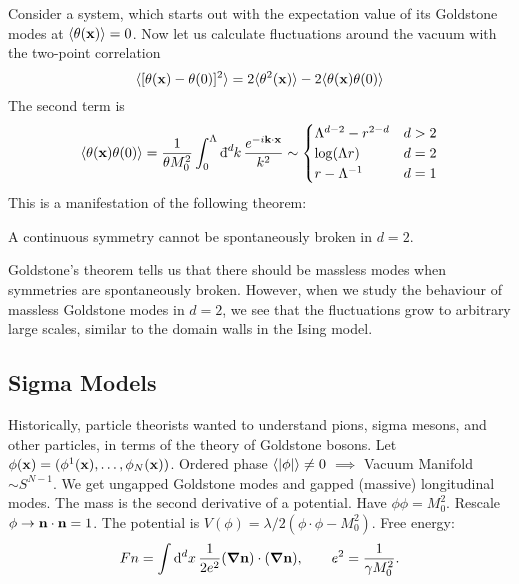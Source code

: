 
Consider a system, which starts out with the expectation value of its Goldstone modes at $\langle \theta (\vb{x}) \rangle = 0$.
Now let us calculate fluctuations around the vacuum with the two-point correlation
\begin{equation}
  \langle [\theta(\vb{x}) - \theta(0)]^2 \rangle = 2 \langle \theta^2 (\vb{x}) \rangle - 2 \langle \theta(\vb{x}) \theta(0) \rangle
\end{equation}
The second term is
\begin{equation}
  \langle \theta(\vb{x}) \theta(0) \rangle = \frac{1}{\theta M_0^2} \int_0^\Lambda \bdd[d]{k} \frac{e^{-i\vb{k} \cdot \vb{x}}}{ k^2} \sim
  \begin{cases}
    \Lambda^{d-2} - r^{2-d} & d > 2 \\
    \log(\Lambda r) & d = 2 \\
    r - \Lambda^{-1} & d = 1
  \end{cases}
\end{equation}
This is a manifestation of the following theorem:
\begin{theorem} \label{thm:mermin-wagner}
  A continuous symmetry cannot be spontaneously broken in $d = 2$.
\end{theorem}

Goldstone's theorem tells us that there should be massless modes when symmetries are spontaneously broken. However, when we study the behaviour of massless Goldstone modes in $d = 2$, we see that the fluctuations grow to arbitrary large scales, similar to the domain walls in the Ising model.

\subsection*{Sigma Models}%

Historically, particle theorists wanted to understand pions, sigma mesons, and other particles, in terms of the theory of Goldstone bosons.
Let $\phi(\vb{x}) = (\phi^1(\vb{x}), \dots, \phi_N(\vb{x}) )$.
Ordered phase $\langle \abs{\phi} \rangle \neq 0$ $\implies$ Vacuum Manifold $\sim S^{N-1}$.
We get ungapped Goldstone modes and gapped (massive) longitudinal modes.
The mass is the second derivative of a potential.
Have $\phi\phi = M_0^2$. Rescale $\phi \to \vb{n} \cdot \vb{n} = 1$.
The potential is $V(\phi) = \lambda/2 (\phi \cdot \phi - M_0^2)$.
Free energy: 
\begin{equation}
  F{n} = \int \dd[d]{x} \frac{1}{2 e^2} (\grad \vb{n}) \cdot (\grad \vb{n}), \qquad e^2 = \frac{1}{\gamma M_0^2}.
\end{equation}

